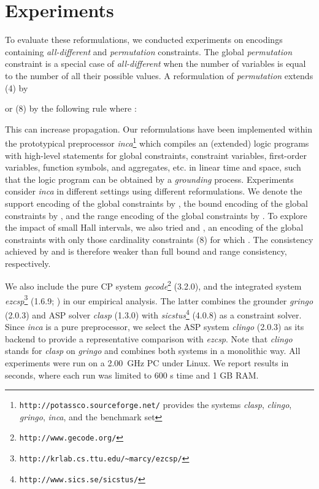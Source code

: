 \documentclass[letterpaper]{article}
\newcommand{\systemname}[1]{\textit{#1}}
\newcommand{\encsup}{}
\newcommand{\encbou}{}
\newcommand{\encran}{}
\newcommand{\encbouh}[1]{\encbou}
\newcommand{\encranh}[1]{\encran}
\newcommand{\citeay}[1]{\citeauthor{#1} \citeyear{#1}}
\begin{document}
\section{Experiments}
To evaluate these reformulations, we conducted experiments on encodings containing \emph{all-different} and \emph{permutation} constraints.
The global \emph{permutation} constraint is a special case of \emph{all-different} when the number of variables is equal to the number of all their possible values. A reformulation of \emph{permutation} extends (4) by

or (8) by the following rule where :

This can increase propagation.
Our reformulations have been implemented within the prototypical preprocessor \systemname{inca}\footnote{\texttt{http://potassco.sourceforge.net/} provides the systems \systemname{clasp}, \systemname{clingo}, \systemname{gringo}, \systemname{inca}, and the benchmark set} which compiles an (extended) logic programs with high-level statements for global constraints, constraint variables, first-order variables, function symbols, and aggregates, etc. in linear time and space, such that the logic program can be obtained by a \emph{grounding} process.
Experiments consider \systemname{inca} in different settings using different reformulations. We denote the support encoding of the global constraints by \encsup, the bound encoding of the global constraints by \encbou, and the range encoding of the global constraints by \encran. To explore the impact of small Hall intervals, we also tried \encbouh{k} and \encranh{k}, an encoding of the global constraints with only those cardinality constraints (8) for which . The consistency achieved by \encbouh{k} and \encranh{k} is therefore weaker than full bound and range consistency, respectively.

We also include the pure CP system \systemname{gecode}\footnote{\texttt{http://www.gecode.org/}} (3.2.0), and the integrated system \systemname{ezcsp}\footnote{\texttt{http://krlab.cs.ttu.edu/\~{}marcy/ezcsp/}} (1.6.9; \citeay{ba09a}) in our empirical analysis. The latter combines the grounder \systemname{gringo} (2.0.3) and ASP solver \systemname{clasp} (1.3.0) with \systemname{sicstus}\footnote{\texttt{http://www.sics.se/sicstus/}} (4.0.8) as a constraint solver.
Since \systemname{inca} is a pure preprocessor, we select the ASP system \systemname{clingo} (2.0.3) as its backend to provide a representative comparison with \systemname{ezcsp}. Note that \systemname{clingo} stands for \systemname{clasp} on \systemname{gringo} and combines both systems in a monolithic way.
All experiments were run on a 2.00~GHz PC under Linux. We report results in seconds, where each run was limited to 600 s time and 1 GB RAM.
\end{document}
